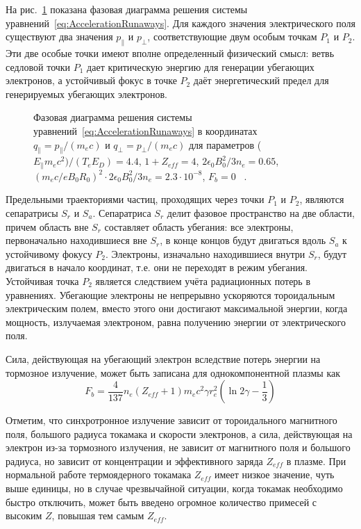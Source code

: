 На рис.~\ref{fig:solisRunawayPhaseDiagram} показана фазовая диаграмма решения системы уравнений~\ref{eq:AccelerationRunaways}. Для каждого значения электрического поля существуют два значения $p_{\parallel}$ и $p_{\perp}$, соответствующие двум особым точкам $P_1$ и $P_2$. Эти две особые точки имеют вполне определенный физический смысл: ветвь седловой точки $P_1$ дает критическую энергию для генерации убегающих электронов, а устойчивый фокус в точке $P_2$ даёт энергетический предел для генерируемых убегающих электронов.

\begin{figure}[ht]
  \caption{ Фазовая диаграмма решения системы уравнений~\ref{eq:AccelerationRunaways} в координатах $q_{\parallel} = p_{\parallel}/(m_e c)$ и $q_{\perp} = p_{\perp}/(m_e c)$ для параметров ( $E_{\parallel} m_e c^2 )/(T_e E_D ) = 4.4$, $ 1 + Z_{eff} = 4 $, $ 2 \epsilon_0 B_0^2 / 3 n_e = 0.65 $, $ ( m_e c / e B_0 R_0 )^2 \cdot 2 \epsilon_0 B_0^2 / 3 n_e = 2.3 \cdot 10^{-8} $, $F_b = 0$ ~\cite{MartinSolis1998}.}
  \label{fig:solisRunawayPhaseDiagram}
\end{figure}

Предельными траекториями частиц, проходящих через точки $P_1$ и $P_2$, являются сепаратрисы $S_r$ и $S_a$. Сепаратриса $S_r$ делит фазовое пространство на две области, причем область вне $S_r$ составляет область убегания: все электроны, первоначально находившиеся вне $S_r$, в конце концов будут двигаться вдоль $S_a$ к устойчивому фокусу $P_2$. Электроны, изначально находившиеся внутри $S_r$, будут двигаться в начало координат, т.е. они не переходят в режим убегания. Устойчивая точка $P_2$ является следствием учёта радиационных потерь в уравнениях. Убегающие электроны не непрерывно ускоряются тороидальным электрическим полем, вместо этого они достигают максимальной энергии, когда мощность, излучаемая электроном, равна получению энергии от электрического поля.  

Сила, действующая на убегающий электрон вследствие потерь энергии на тормозное излучение, может быть записана для однокомпонентной плазмы как \cite{Bakhtiari2005}
\begin{equation*}
  F_b = \frac{4}{137} n_e ( Z_{eff} + 1 ) m_e c^2 \gamma r_e^2 \left( \ln 2 \gamma - \frac{1}{3} \right)
\end{equation*}

Отметим, что синхротронное излучение зависит от тороидального магнитного поля, большого радиуса токамака и скорости электронов, а сила, действующая на электрон из-за тормозного излучения, не зависит от магнитного поля и большого радиуса, но зависит от концентрации и эффективного заряда $Z_{eff}$ в плазме. При нормальной работе термоядерного токамака $Z_{eff}$ имеет низкое значение, чуть выше единицы, но в случае чрезвычайной ситуации, когда токамак необходимо быстро отключить, может быть введено огромное количество примесей с высоким $Z$, повышая тем самым $Z_{eff}$. 

